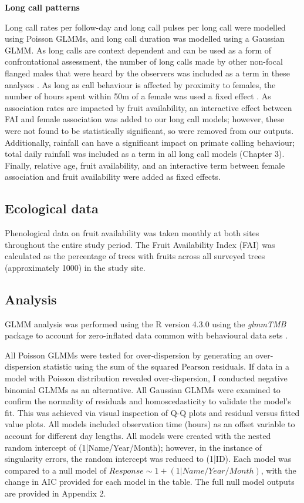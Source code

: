 \textbf{Long call patterns}

Long call rates per follow-day and long call pulses per long call were modelled using Poisson GLMMs, and long call duration was modelled using a Gaussian GLMM. As long calls are context dependent and can be used as a form of confrontational assessment, the number of long calls made by other non-focal flanged males that were heard by the observers was included as a term in these analyses \citep{Spillmann.2016}. As long as call behaviour is affected by proximity to females, the number of hours spent within 50m of a female was used a fixed effect \citep{Spillmann.2010}. As association rates are impacted by fruit availability, an interactive effect between FAI and female association was added to our long call models; however, these were not found to be statistically significant, so were removed from our outputs. Additionally, rainfall can have a significant impact on primate calling behaviour; total daily rainfall was included as a term in all long call models (Chapter 3). Finally, relative age, fruit availability, and an interactive term between female association and fruit availability were added as fixed effects. 

\subsection{Ecological data}
Phenological data on fruit availability was taken monthly at both sites throughout the entire study period. The Fruit Availability Index (FAI) was calculated as the percentage of trees with fruits across all surveyed trees (approximately 1000) in the study site. 

\subsection{Analysis}

GLMM analysis was performed using the R version 4.3.0 using the \textit{glmmTMB} package to account for zero-inflated data common with behavioural data sets \citep{R.2018, Brooks.2017}. 

All Poisson GLMMs were tested for over‐dispersion by generating an over-dispersion statistic using the sum of the squared Pearson residuals. If data in a model with Poisson distribution revealed over‐dispersion, I conducted negative binomial GLMMs as an alternative. All Gaussian GLMMs were examined to confirm the normality of residuals and homoscedasticity to validate the model's fit. This was achieved via visual inspection of Q-Q plots and residual versus fitted value plots. All models included observation time (hours) as an offset variable to account for different day lengths. All models were created with the nested random intercept of (1|Name/Year/Month); however, in the instance of singularity errors, the random intercept was reduced to (1|ID). Each model was compared to a null model of $Response \sim 1 + (1|Name/Year/Month)$, with the change in AIC provided for each model in the table. The full null model outputs are provided in Appendix 2. 

